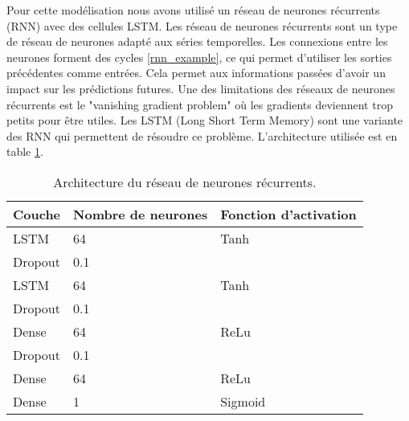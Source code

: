 Pour cette modélisation nous avons utilisé un réseau de neurones récurrents (RNN) avec des cellules LSTM.
Les réseau de neurones récurrents sont un type de réseau de neurones adapté aux séries temporelles.
Les connexions entre les neurones forment des cycles \ref{rnn_example}, ce qui permet d'utiliser les sorties précédentes comme entrées.
Cela permet aux informations passées d'avoir un impact sur les prédictions futures.
Une des limitations des réseaux de neurones récurrents est le "vanishing gradient problem" où les gradients deviennent trop petits pour être utiles.
Les LSTM (Long Short Term Memory) sont une variante des RNN qui permettent de résoudre ce problème.
L'architecture utilisée est en table \ref{lstm_architecture}.
\begin{table}[H]
    \begin{center}
        \caption{\label{lstm_architecture}Architecture du réseau de neurones récurrents.}
        \begin{tabular}{| l | l | l |}
            Couche  & Nombre de neurones & Fonction d'activation \\ \hline
            LSTM    & 64                 & Tanh                  \\
            Dropout & 0.1                &                       \\
            LSTM    & 64                 & Tanh                  \\
            Dropout & 0.1                &                       \\
            Dense   & 64                 & ReLu                  \\
            Dropout & 0.1                &                       \\
            Dense   & 64                 & ReLu                  \\
            Dense   & 1                  & Sigmoid               \\
        \end{tabular}
    \end{center}
\end{table}


